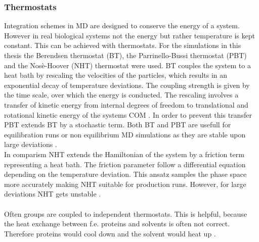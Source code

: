 \subsubsection{Thermostats}
Integration schemes in MD are designed to conserve the energy of a system. However in real biological systems not the energy but rather temperature is kept constant. This can be achieved with thermostats. For the simulations in this thesis the Berendsen thermostat \autocite{berendsen} (BT), the Parrinello-Bussi thermostat \autocite{parinelloBussi} (PBT) and the Nosè-Hoover (NHT) thermostat \autocites{nosehooverthermo}{nosehooverthermo2} were used. BT couples the system to a heat bath by rescaling the velocities of the particles, which results in an exponential decay of temperature deviations. The coupling strength is given by the time scale, over which the energy is conducted. The rescaling involves a transfer of kinetic energy from internal degrees of freedom to translational and rotational kinetic energy of the systems COM \autocite{velRescaleSucks}. In order to prevent this transfer PBT extends BT by a stochastic term. Both BT and PBT are usefull for equilibration runs or non equilibrium MD simulations as they are stable upon large deviations \autocites{berendsen}[p. 31]{gromacsManual}.\\%
In comparism NHT extends the Hamiltonian of the system by a friction term representing a heat bath. The friction parameter follow a differential equation depending on the temperature deviation. This ansatz samples the phase space more accurately making NHT suitable for production runs. However, for large deviations NHT gets unstable \autocite[p. 32f]{gromacsManual}.\\
\\
Often groups are coupled to independent thermostats. This is helpful, because the heat exchange between f.e. proteins and solvents is often not correct. Therefore proteins would cool down and the solvent would heat up \autocite[p. 34]{gromacsManual}.
